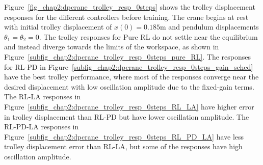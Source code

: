 Figure~\ref{fig_chap2:dpcrane_trolley_resp_0steps} shows the trolley displacement responses for the different controllers before training.
The crane begins at rest with initial trolley displacement of $x(0)=0.185\si{\meter}$ and pendulum displacements $\theta_1=\theta_2=0$.
The trolley responses for Pure RL do not settle near the equilibrium and instead diverge towards the limits of the workspace, as shown in Figure~\ref{subfig_chap2:dpcrane_trolley_resp_0steps_pure_RL}. The responses for RL-PD in Figure~\ref{subfig_chap2:dpcrane_trolley_resp_0steps_gain_sched} have the best trolley performance, where most of the responses converge near the desired displacement with low oscillation amplitude due to the fixed-gain terms. The RL-LA responses in Figure~\ref{subfig_chap2:dpcrane_trolley_resp_0steps_RL_LA} have higher error in trolley displacement than RL-PD but have lower oscillation amplitude. The RL-PD-LA responses in Figure~\ref{subfig_chap2:dpcrane_trolley_resp_0steps_RL_PD_LA} have less trolley displacement error than RL-LA, but some of the responses have high oscillation amplitude.
%
